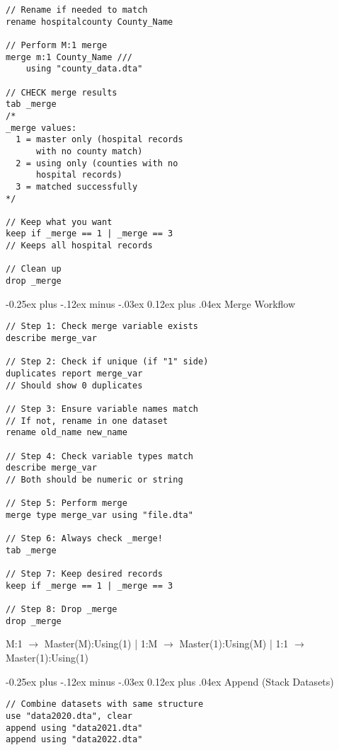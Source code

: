 ﻿\documentclass[8pt,letterpaper]{article}
\makeatletter
\renewcommand{\subsection}{\@startsection{subsection}{2}{0mm}%
                                {-0.25ex plus -.12ex minus -.03ex}%
                                {0.12ex plus .04ex}%
                                {\normalfont\fontsize{8pt}{8pt}\selectfont\bfseries\color{myblue}}}
\makeatother
\begin{document}
\begin{multicols}{2}
\begin{lstlisting}
// Rename if needed to match
rename hospitalcounty County_Name

// Perform M:1 merge
merge m:1 County_Name ///
    using "county_data.dta"

// CHECK merge results
tab _merge
/*
_merge values:
  1 = master only (hospital records
      with no county match)
  2 = using only (counties with no
      hospital records)
  3 = matched successfully
*/

// Keep what you want
keep if _merge == 1 | _merge == 3
// Keeps all hospital records

// Clean up
drop _merge
\end{lstlisting}

\subsection{Merge Workflow}
\begin{lstlisting}
// Step 1: Check merge variable exists
describe merge_var

// Step 2: Check if unique (if "1" side)
duplicates report merge_var
// Should show 0 duplicates

// Step 3: Ensure variable names match
// If not, rename in one dataset
rename old_name new_name

// Step 4: Check variable types match
describe merge_var
// Both should be numeric or string

// Step 5: Perform merge
merge type merge_var using "file.dta"

// Step 6: Always check _merge!
tab _merge

// Step 7: Keep desired records
keep if _merge == 1 | _merge == 3

// Step 8: Drop _merge
drop _merge
\end{lstlisting}

\begin{tipbox}
M:1 $\rightarrow$ Master(M):Using(1) | 1:M $\rightarrow$ Master(1):Using(M) | 1:1 $\rightarrow$ Master(1):Using(1)
\end{tipbox}\vspace{0.15cm}

\subsection{Append (Stack Datasets)}
\begin{lstlisting}
// Combine datasets with same structure
use "data2020.dta", clear
append using "data2021.dta"
append using "data2022.dta"


\end{lstlisting}
\end{multicols}
\end{document}
